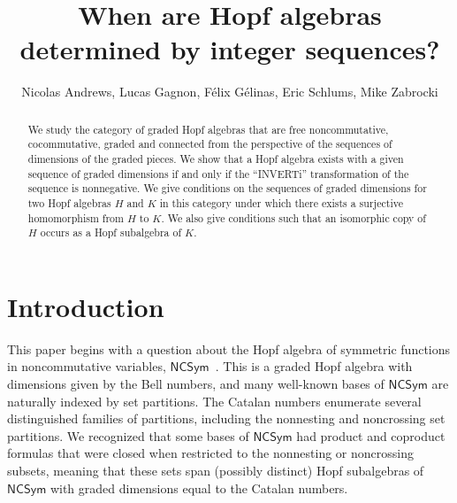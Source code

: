 \documentclass[11pt]{amsart}
\title{When are Hopf algebras determined by integer sequences?}
\author{Nicolas Andrews, Lucas Gagnon, F\'{e}lix G\'{e}linas, Eric Schlums, Mike Zabrocki}
\theoremstyle{definition}
\numberwithin{equation}{section}
\newcommand{\NCSym}{\mathsf{NCSym}}
\begin{document}
\maketitle
\begin{abstract}
We study the category of graded Hopf algebras that are
free noncommutative, cocommutative,
graded and connected
from the perspective of the sequences of dimensions of the graded pieces.
We show that a Hopf algebra exists with a given sequence of graded dimensions
if and only if the ``INVERTi'' transformation of the sequence is nonnegative.
We give conditions on the sequences of graded dimensions for two Hopf algebras $H$ and $K$
in this category under which there exists a surjective homomorphism from $H$ to $K$.
We also give conditions such that an isomorphic copy of
$H$ occurs as a Hopf subalgebra of $K$.
\end{abstract}

\setcounter{tocdepth}{1}
\tableofcontents

\section{Introduction}

This paper begins with a question about the Hopf algebra of symmetric functions in noncommutative variables, $\NCSym$~\cite{AgEtAl12, BHRZ05, GebSag01, HNT08, RS06, W36}.  
This is a graded Hopf algebra with dimensions given by the Bell numbers, and many well-known bases of $\NCSym$ are naturally indexed by set partitions.  
The Catalan numbers enumerate several distinguished families of partitions, including the nonnesting and noncrossing set partitions.  
We recognized that some bases of $\NCSym$ had product and coproduct formulas that were closed when restricted to the nonnesting or noncrossing subsets, meaning that these sets span (possibly distinct) Hopf subalgebras of $\NCSym$ with graded dimensions equal to the Catalan numbers.
\end{document}
